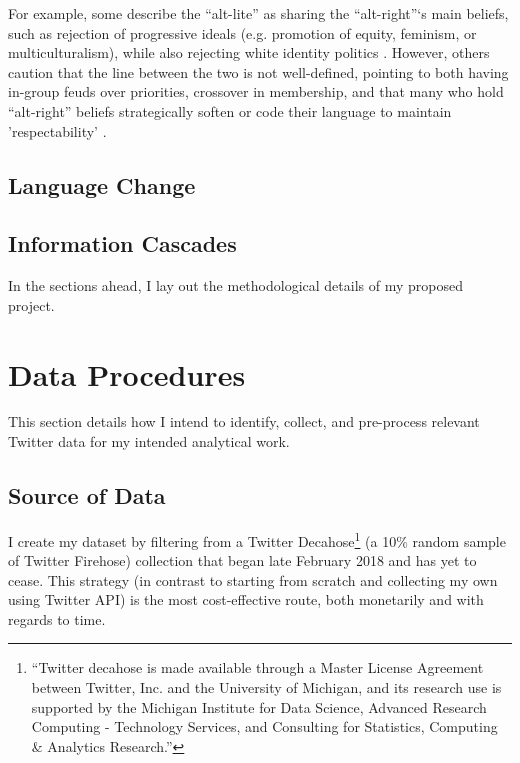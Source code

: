 \documentclass[acmlarge, screen, authorversion]{acmart}
\begin{document}
 For example, some describe the ``alt-lite” as
sharing the ``alt-right''‘s main beliefs, such as rejection of progressive
ideals (e.g. promotion of equity, feminism, or multiculturalism), while also rejecting white identity politics \cite{mainRiseAltRight2018, hawleyAltRightWhatEveryone2018}. However, others
caution that the line between the two is not well-defined, pointing to both
having in-group feuds over priorities, crossover in membership, and that
many who  hold “alt-right” beliefs strategically soften or code their language to maintain 'respectability' \cite{anti-defamationleagueAltRightAlt, sternProudBoysWhite2019}.

\subsection{Language Change}


\subsection{Information Cascades}

In the sections ahead, I lay out the methodological details of my proposed project.


\section{Data Procedures}
This section details how I intend to identify, collect, and pre-process relevant Twitter data for my intended analytical work.

    \subsection{Source of Data}
    
    I create my dataset by filtering from a Twitter Decahose\footnote{“Twitter decahose is made available through a Master License Agreement between Twitter, Inc. and the University of Michigan, and its research use is supported by the Michigan Institute for Data Science, Advanced Research Computing - Technology Services, and Consulting for Statistics, Computing \& Analytics Research.”} (a 10\% random sample of Twitter Firehose) collection that began late February 2018 and has yet to cease. This strategy (in contrast to starting from scratch and collecting my own using Twitter API) is the most cost-effective route, both monetarily and with regards to time.
\end{document}
